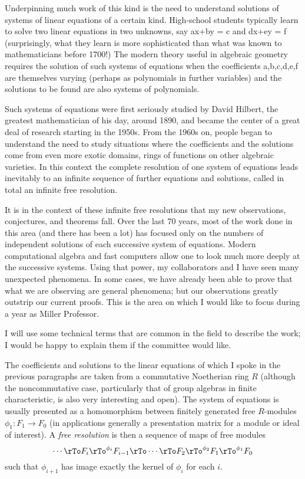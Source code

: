 \documentclass[11pt, oneside]{article}   	%
\begin{document}
Underpinning much work of this kind is the need to understand solutions of systems of linear equations of a certain kind. High-school students typically learn to solve two linear equations in two unknowns, say ax+by = c and dx+ey = f (surprisingly, what they learn is more sophisticated than what was known to mathematicians before  1700!) The modern theory useful in algebraic geometry requires the solution of such systems of equations when the coefficients a,b,c,d,e,f are themselves varying (perhaps as polynomials in further variables) and the solutions to be found are also systems of polynomials. 

Such systems of equations were first seriously studied by David Hilbert, the greatest mathematician of his day, around 1890, and became the center of a great deal of research starting in the 1950s. From the 1960s on, people began to understand the need to study situations where the coefficients and the solutions come from even more exotic domains, rings of functions on other algebraic varieties. In this context the complete resolution of one system of equations leads inevitably to an infinite sequence of further equations and solutions, called in total an infinite free resolution. 

It is in the context of these infinite free resolutions that my new observations, conjectures, and theorems fall. Over the last 70 years, most of the work done in this area (and there has been a lot) has focused only on the numbers of independent solutions of each successive system of equations. Modern computational algebra and fast computers allow one to look much more deeply at the successive systems. Using that power, my collaborators and I have seen many unexpected phenomena. In some cases, we have already been able to prove that what we are observing are general phenomena; but our observations greatly outstrip our current proofs.
This is the area on which I would like to focus during a year as Miller Professor.


\smallbreak
{}
\smallbreak
I will use some technical terms that are common in the field to describe the work; I would be happy to explain them if the committee would like.

The coefficients and solutions to the linear equations of which I spoke in the previous paragraphs are taken from a commutative Noetherian ring $R$ (although the noncommutative case, particularly that of group algebras in finite characteristic, is also very interesting and open). The system of equations is usually presented as a homomorphism between finitely generated free $R$-modules $\phi_{1}: F_{1}\to F_{0}$ (in applications generally a presentation matrix for a module or ideal of interest). A \emph{free resolution} is then
a sequence of maps of free modules
$$
\cdots\rTo F_{i}\rTo^{\phi_{i}} F_{i-1} \rTo \cdots \rTo F_{2} \rTo^{\phi_{2}} F_{1}\rTo^{\phi_{1}} F_{0}
$$
such that $\phi_{i+1}$ has image exactly the kernel of $\phi_{i}$ for each $i$. 
\end{document}
